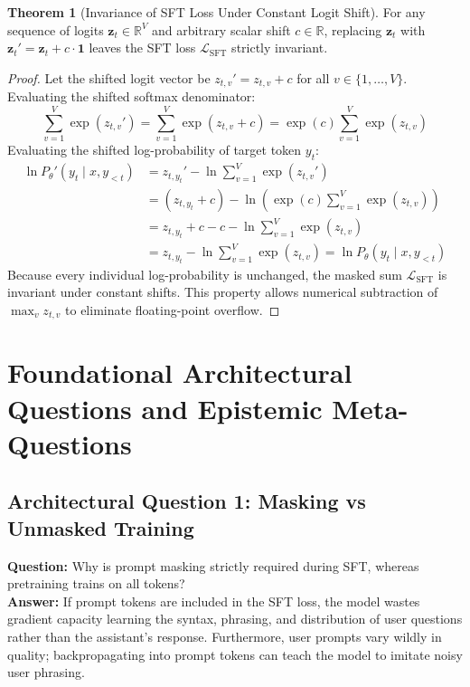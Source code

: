 \documentclass[11pt,a4paper]{article}
\theoremstyle{definition}
\newtheorem{theorem}{\textbf{Theorem}}[section]
\begin{document}
\begin{theorem}[Invariance of SFT Loss Under Constant Logit Shift]
For any sequence of logits $\mathbf{z}_t \in \mathbb{R}^V$ and arbitrary scalar shift $c \in \mathbb{R}$, replacing $\mathbf{z}_t$ with $\mathbf{z}_t' = \mathbf{z}_t + c \cdot \mathbf{1}$ leaves the SFT loss $\mathcal{L}_{\text{SFT}}$ strictly invariant.
\end{theorem}

\begin{proof}
Let the shifted logit vector be $z_{t, v}' = z_{t, v} + c$ for all $v \in \{1, \dots, V\}$.
Evaluating the shifted softmax denominator:
{\boldmath
\begin{equation}
\sum_{v=1}^V \exp(z_{t, v}') = \sum_{v=1}^V \exp(z_{t, v} + c) = \exp(c) \sum_{v=1}^V \exp(z_{t, v})
\end{equation}
}
Evaluating the shifted log-probability of target token $y_t$:
{\boldmath
\begin{align}
\ln P_\theta'(y_t \mid x, y_{<t}) &= z_{t, y_t}' - \ln \sum_{v=1}^V \exp(z_{t, v}') \\
&= (z_{t, y_t} + c) - \ln\left( \exp(c) \sum_{v=1}^V \exp(z_{t, v}) \right) \\
&= z_{t, y_t} + c - c - \ln \sum_{v=1}^V \exp(z_{t, v}) \\
&= z_{t, y_t} - \ln \sum_{v=1}^V \exp(z_{t, v}) = \ln P_\theta(y_t \mid x, y_{<t})
\end{align}
}
Because every individual log-probability is unchanged, the masked sum $\mathcal{L}_{\text{SFT}}$ is invariant under constant shifts. This property allows numerical subtraction of $\max_v z_{t, v}$ to eliminate floating-point overflow.
\end{proof}

\section{Foundational Architectural Questions and Epistemic Meta-Questions}

\subsection{Architectural Question 1: Masking vs Unmasked Training}
\textbf{Question:} Why is prompt masking strictly required during SFT, whereas pretraining trains on all tokens?\\
\textbf{Answer:} If prompt tokens are included in the SFT loss, the model wastes gradient capacity learning the syntax, phrasing, and distribution of user questions rather than the assistant's response. Furthermore, user prompts vary wildly in quality; backpropagating into prompt tokens can teach the model to imitate noisy user phrasing.
\end{document}
